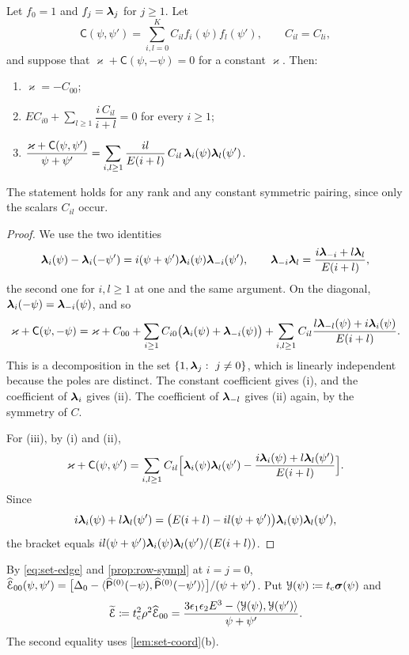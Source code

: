 \begin{lem}\label{lem:lea-res}
Let $f_0=1$ and $f_j=\boldsymbol{\lambda}_j$ for $j\ge1$. Let
\[
\mathsf{C}(\psi,\psi')=\sum_{i,l=0}^{K}C_{il}f_i(\psi)f_l(\psi'),\qquad C_{il}=C_{li},
\]
and suppose that $\varkappa+\mathsf{C}(\psi,-\psi)=0$ for a constant $\varkappa$. Then:
\begin{enumerate}
\item[(i)] $\varkappa=-C_{00}$;
\item[(ii)] $EC_{i0}+\sum_{l\ge1}\dfrac{i\,C_{il}}{i+l}=0$ for every $i\ge1$;
\item[(iii)] $\dfrac{\varkappa+\mathsf{C}(\psi,\psi')}{\psi+\psi'}=\displaystyle\sum_{i,l\ge1}\frac{il}{E(i+l)}\,C_{il}\,\boldsymbol{\lambda}_i(\psi)\boldsymbol{\lambda}_l(\psi')$.
\end{enumerate}
The statement holds for any rank and any constant symmetric pairing, since only the scalars $C_{il}$ occur.
\end{lem}

\begin{proof}
We use the two identities
\[
\boldsymbol{\lambda}_i(\psi)-\boldsymbol{\lambda}_i(-\psi')=i(\psi+\psi')\boldsymbol{\lambda}_i(\psi)\boldsymbol{\lambda}_{-i}(\psi'),\qquad \boldsymbol{\lambda}_{-i}\boldsymbol{\lambda}_l=\frac{i\boldsymbol{\lambda}_{-i}+l\boldsymbol{\lambda}_l}{E(i+l)},
\]
the second one for $i,l\ge1$ at one and the same argument. On the diagonal, $\boldsymbol{\lambda}_i(-\psi)=\boldsymbol{\lambda}_{-i}(\psi)$, and so
\[
\varkappa+\mathsf{C}(\psi,-\psi)=\varkappa+C_{00}+\sum_{i\ge1}C_{i0}\bigl(\boldsymbol{\lambda}_i(\psi)+\boldsymbol{\lambda}_{-i}(\psi)\bigr)+\sum_{i,l\ge1}C_{il}\frac{l\boldsymbol{\lambda}_{-l}(\psi)+i\boldsymbol{\lambda}_i(\psi)}{E(i+l)}.
\]
This is a decomposition in the set $\{1,\boldsymbol{\lambda}_j:\ j\neq0\}$, which is linearly independent because the poles are distinct. The constant coefficient gives (i), and the coefficient of $\boldsymbol{\lambda}_i$ gives (ii). The coefficient of $\boldsymbol{\lambda}_{-l}$ gives (ii) again, by the symmetry of $C$.

For (iii), by (i) and (ii),
\[
\varkappa+\mathsf{C}(\psi,\psi')=\sum_{i,l\ge1}C_{il}\Bigl[\boldsymbol{\lambda}_i(\psi)\boldsymbol{\lambda}_l(\psi')-\frac{i\boldsymbol{\lambda}_i(\psi)+l\boldsymbol{\lambda}_l(\psi')}{E(i+l)}\Bigr].
\]
Since
\[
i\boldsymbol{\lambda}_i(\psi)+l\boldsymbol{\lambda}_l(\psi')=\bigl(E(i+l)-il(\psi+\psi')\bigr)\boldsymbol{\lambda}_i(\psi)\boldsymbol{\lambda}_l(\psi'),
\]
the bracket equals $il(\psi+\psi')\boldsymbol{\lambda}_i(\psi)\boldsymbol{\lambda}_l(\psi')/(E(i+l))$.
\end{proof}

By \cref{eq:set-edge} and \cref{prop:row-sympl} at $i=j=0$, $\widehat{\mathcal{E}}_{00}(\psi,\psi')=\bigl[\Delta_0-\langle\widehat{\mathsf{P}}^{(0)}(-\psi),\widehat{\mathsf{P}}^{(0)}(-\psi')\rangle\bigr]/(\psi+\psi')$. Put $\mathcal{Y}(\psi)\coloneqq t_{\mathrm{c}}\boldsymbol{\sigma}(\psi)$ and
\begin{equation}\label{eq:lea-Et}
\widetilde{\mathcal{E}}\coloneqq t_{\mathrm{c}}^2\rho^2\widehat{\mathcal{E}}_{00}=\frac{3\epsilon_1\epsilon_2E^3-\langle\mathcal{Y}(\psi),\mathcal{Y}(\psi')\rangle}{\psi+\psi'}.
\end{equation}
The second equality uses \cref{lem:set-coord}(b).

